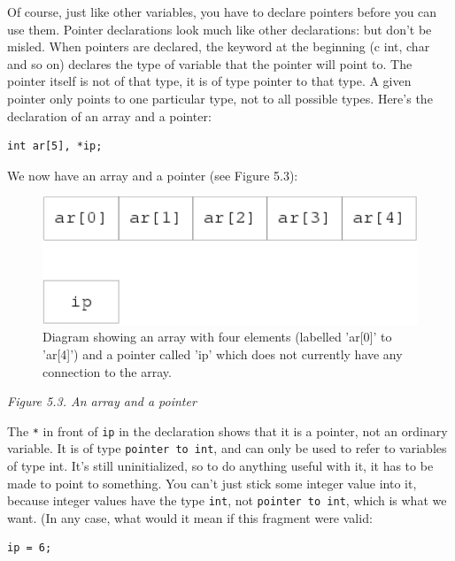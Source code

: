    Of course, just like other variables, you have to declare pointers
    before you can use them. Pointer declarations look much like other
    declarations: but don't be misled. When pointers are declared, the
    keyword at the beginning (c int, char and so on) declares the type of
    variable that the pointer will point to. The pointer itself is not of
    that type, it is of type pointer to that type. A given pointer only
    points to one particular type, not to all possible types. Here's the
    declaration of an array and a pointer:


   \begin{Verbatim}
int ar[5], *ip;
\end{Verbatim}

   We now have an array and a pointer (see Figure 5.3):


   \begin{figure}\centering\includegraphics[type=pdf,read=.pdf,ext=.pdf,scale=1.0]{figure/5.3}\caption{Diagram showing an array with four elements (labelled 'ar[0]' to            'ar[4]') and a pointer called 'ip' which does not currently            have any connection to the array.}\end{figure}

\begin{center}\textit{Figure 5.3. An array and a pointer}\end{center}


   The \texttt{*} in front of \texttt{ip} in the declaration
    shows that it is a pointer, not an ordinary variable. It is of type
    \texttt{pointer to int}, and can only be used to refer to variables
    of type int. It's still uninitialized, so to do anything useful with it,
    it has to be made to point to something. You can't just stick some
    integer value into it, because integer values have the type
    \texttt{int}, not \texttt{pointer to int}, which is what we
    want.  (In any case, what would it mean if this fragment were valid:


   \begin{Verbatim}
ip = 6;
\end{Verbatim}

